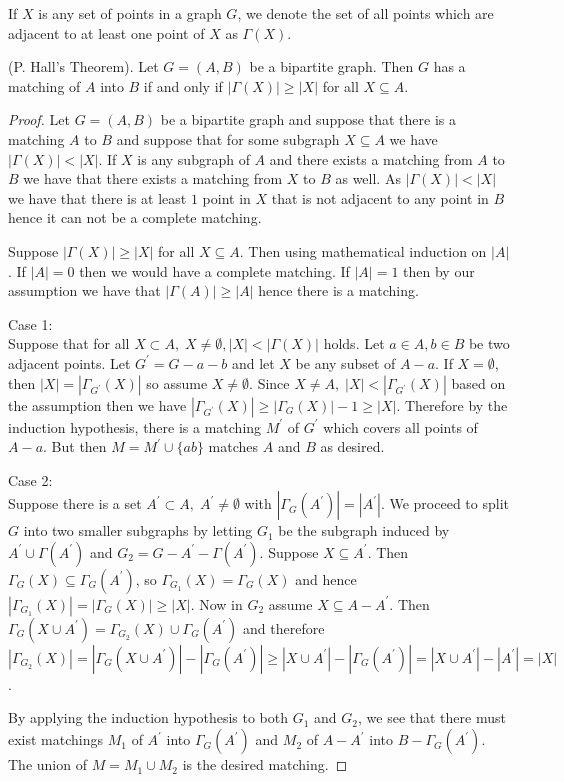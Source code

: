 \documentclass[12pt]{article}
\newenvironment{theorem}[2][Theorem]{\begin{trivlist}
\item[\hskip \labelsep {\bfseries #1}\hskip \labelsep {\bfseries #2.}]}{\end{trivlist}}
\begin{document}
If $X$ is any set of points in a graph $G$, we denote the set of all points which are adjacent to at least one point of $X$ as $\Gamma(X)$.

\begin{theorem}
    {1.1.3.}
    (P. Hall's Theorem). Let $G=(A,B)$ be a bipartite graph. Then $G$ has a matching of $A$ into $B$ if and only if $|\Gamma(X)|\geq |X|$ for all $X \subseteq A$.
\end{theorem}

\begin{proof}

    Let $G=(A,B)$ be a bipartite graph and suppose that there is a matching $A$ to $B$ and suppose that for some subgraph $X \subseteq A$ we have $|\Gamma(X)|<|X|$. If $X$ is any subgraph of $A$ and there exists a matching from $A$ to $B$ we have that there exists a matching from $X$ to $B$ as well. As $|\Gamma(X)|<|X|$ we have that there is at least $1$ point in $X$ that is not adjacent to any point in $B$ hence it can not be a complete matching.

    Suppose $|\Gamma(X)|\geq |X|$ for all $X\subseteq A$. Then using mathematical induction on $|A|$. If $|A|=0$ then we would have a complete matching. If $|A|=1$ then by our assumption we have that $|\Gamma(A)|\geq |A|$ hence there is a matching.


    Case 1: \\

    Suppose that for all $X \subset A,\; X\not = \emptyset, |X|< |\Gamma(X)|$ holds. Let $a\in A,b \in B$ be two adjacent points. Let $G^{\prime}= G - a - b$ and let $X$ be any subset of $A-a$. If $X = \emptyset$, then $|X|=|\Gamma_{G^\prime}(X)|$ so assume $X \not = \emptyset$. Since $X\not = A,\; |X|< |\Gamma_{G^\prime}(X)|$ based on the assumption then we have $|\Gamma_{G^\prime}(X)|\geq |\Gamma_{G}(X)|-1\geq|X|$. Therefore by the induction hypothesis, there is a matching $M^\prime$ of $G^\prime$ which covers all points of $A-a$. But then $M=M^\prime \cup \{ab\}$ matches $A$ and $B$ as desired.

    Case 2:\\
    Suppose there is a set $A^\prime \subset A, \; A^\prime \not = \emptyset$ with $|\Gamma_G(A^\prime)|=|A^\prime|$. We proceed to split $G$ into two smaller subgraphs by letting $G_1$ be the subgraph induced by $A^\prime \cup \Gamma(A^\prime)$ and $G_2=G-A^\prime-\Gamma(A^\prime)$. Suppose $X\subseteq A^\prime$. Then $\Gamma_G(X)\subseteq \Gamma_G(A^\prime)$, so $\Gamma_{G_1}(X)=\Gamma_G(X)$ and hence $|\Gamma_{G_1}(X)|=|\Gamma_G(X)|\geq |X|$. Now in $G_2$ assume $X\subseteq A- A^\prime$. Then $\Gamma_G(X\cup A^\prime)=\Gamma_{G_2}(X)\cup \Gamma_G(A^\prime)$ and therefore $|\Gamma_{G_2}(X)|=|\Gamma_G(X\cup A^\prime)|-|\Gamma_{G}(A^\prime)|\geq |X\cup A^\prime|-|\Gamma_G(A^\prime)|=|X\cup A^\prime|-|A^\prime|=|X|$.

    By applying the induction hypothesis to both $G_1$ and $G_2$, we see that there must exist matchings $M_1$ of $A^\prime$ into $\Gamma_G(A^\prime)$ and $M_2$ of $A-A^\prime$ into $B-\Gamma_G(A^\prime)$. The union of $M=M_1 \cup M_2$ is the desired matching.


\end{proof}
\end{document}
